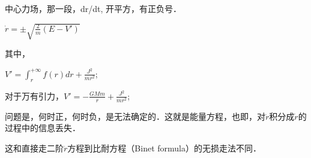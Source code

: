 中心力场，那一段，dr/dt, 开平方，有正负号．

$\dot{r}=\pm\sqrt{\frac{2}{m}(E-V')}$

其中，

$V'=\int_{r}^{+\infty}{f(r)dr}+\frac{J^2}{mr^2}$;

对于万有引力，$V'=-\frac{GMm}{r}+\frac{J^2}{mr^2}$;

问题是，何时正，何时负，是无法确定的．这就是能量方程，也即，对${\ddot{r}}$积分成${\dot{r}}$的过程中的信息丢失．

这和直接走二阶${\ddot{r}}$方程到比耐方程（Binet formula）的无损走法不同．
